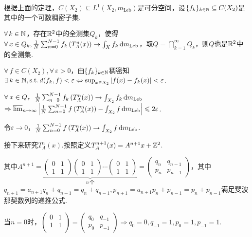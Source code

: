 根据上面的定理，$C(X_2)\subseteq L^1(X_2,m_\mathrm{Leb})$是可分空间，设$\{f_k\}_{k\in\mb{N}}\subseteq C(X_2)$是其中的一个可数稠密子集.\par
$\forall\, k\in\mb{N}$，存在$\mb{R}^2$中的全测集$Q_k$，使得$\forall\, x\in Q_k,\frac{1}{N}\sum_{n=0}^{N-1}{f_k \left(T^n_A(x)\right)}\to \int_X{f_k}\d m_\mathrm{Leb}$，取$Q=\bigcap_{k=1}^\infty{Q_k}$，则$Q$也是$\mb{R}^2$中的全测集.\par
$\forall\, f\in C(X_2),\forall\, \varepsilon>0$，由$\{f_k\}_{k\in\mb{N}}$稠密知$\exists\, k\in\mb{N},\st d(f_k,f)<\varepsilon \Leftrightarrow \sup_{x\in X_2}{|f(x)-f_k(x)|}<\varepsilon$.\par
$\forall\, x\in Q$，$\frac{1}{N}\sum_{n=0}^{N-1}{f_k \left(T^n_A(x)\right)}\to \int_{X_2}{f_k}\d m_\mathrm{Leb}$$\Rightarrow \varlimsup_{n\to\infty}{\left|\frac{1}{N}\sum_{n=0}^{N-1}{f \left(T^n_A(x)\right)}-\int_{X_2}{f}\d m_\mathrm{Leb}\right|}\leq 2\varepsilon $.\par
令$\varepsilon\to 0$，$\frac{1}{N}\sum_{n=0}^{N-1}{f \left(T^n_A(x)\right)}\to \int_{X_2}{f}\d m_\mathrm{Leb}$.\par
接下来研究$T^n_A(x)$.按照定义$T^{n+1}_A(x)=A^{n+1}x+\mb{Z}^2$.\par
其中$A^{n+1}=\underbrace{\begin{pmatrix}
    0 & 1\\
    1 & 1
\end{pmatrix}\begin{pmatrix}
    0 & 1\\
    1 & 1
\end{pmatrix}\cdots\begin{pmatrix}
    0 & 1\\
    1 & 1
\end{pmatrix}}_{n\,\text{个}}=\begin{pmatrix}
    q_n & q_{n-1} \\
    p_n & p_{n-1}
\end{pmatrix}$，其中$q_{n+1}=a_{n+1}q_n+q_{n-1}=q_n+q_{n-1},p_{n+1}=a_{n+1}p_n+p_{n-1}=p_n+p_{n-1}$满足斐波那契数列的递推公式.\par
当$n=0$时，$\begin{pmatrix}
    0 & 1 \\
    1 & 1 \\
\end{pmatrix}=\begin{pmatrix}
    q_0 & q_{-1} \\
    p_0 & p_{-1}
\end{pmatrix}\Rightarrow q_0=0,q_{-1}=1,p_0=1,p_{-1}=1$.\par
$$
